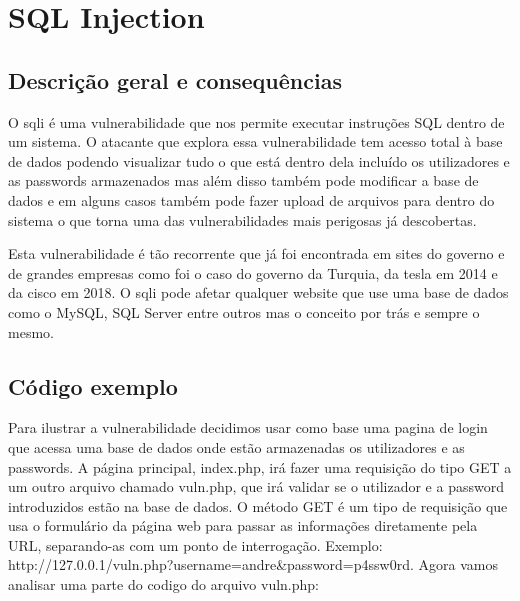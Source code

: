 \documentclass{report}
\begin{document}
	
\clearpage
\section{SQL Injection}
\subsection{Descrição geral e consequências}
	

O \ac{sqli} é uma vulnerabilidade que nos permite executar instruções SQL dentro de um sistema. O atacante que explora essa vulnerabilidade tem acesso total à base de dados podendo visualizar tudo o que está dentro dela incluído os utilizadores e as passwords armazenados mas além disso também pode modificar a base de dados e em alguns casos também pode fazer upload de arquivos para dentro do sistema o que torna uma das vulnerabilidades mais perigosas já descobertas. 

Esta vulnerabilidade é tão recorrente que já foi encontrada em sites do governo e de grandes empresas como foi o caso do governo da Turquia, da tesla em 2014 e da cisco em 2018. O \ac{sqli} pode afetar qualquer website que use uma base de dados como o MySQL, SQL Server entre outros mas o conceito por trás e sempre o mesmo. 
\clearpage
\subsection{Código exemplo}

Para ilustrar a vulnerabilidade decidimos usar como base uma pagina de login que acessa uma base de dados onde estão armazenadas os utilizadores e as passwords. A página principal, index.php, irá fazer uma requisição do tipo GET a um outro arquivo chamado vuln.php, que irá validar se o utilizador e a password introduzidos estão na base de dados. O método GET é um tipo de requisição que usa o formulário da página web para passar as informações diretamente pela URL, separando-as com um ponto de interrogação.
Exemplo:
http://127.0.0.1/vuln.php?username=andre\&password=p4ssw0rd.
Agora vamos analisar uma parte do codigo do arquivo vuln.php:
\end{document}

